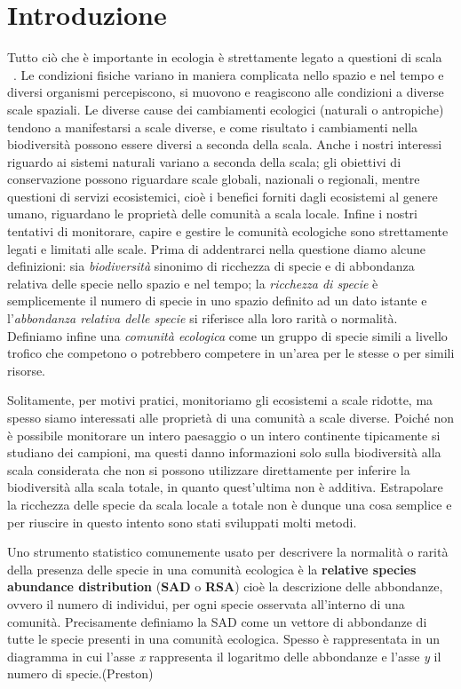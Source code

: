 \chapter*{Introduzione}
Tutto ciò che è importante in ecologia è strettamente legato a questioni di scala ~\cite{doi:10.1111/2041-210X.12319}. Le condizioni fisiche variano in maniera complicata nello spazio e nel tempo e diversi organismi percepiscono, si muovono e reagiscono alle condizioni a diverse scale spaziali. 
Le diverse cause dei cambiamenti ecologici (naturali o antropiche) tendono a manifestarsi a scale diverse, e come risultato i cambiamenti nella biodiversità possono essere diversi a seconda della scala. Anche i nostri interessi riguardo ai sistemi naturali variano a seconda della scala; gli obiettivi di conservazione possono riguardare scale globali, nazionali o regionali, mentre questioni di servizi ecosistemici, cioè i benefici forniti dagli ecosistemi al genere umano, riguardano le proprietà delle comunità a scala locale. Infine i nostri tentativi di monitorare, capire e gestire le comunità ecologiche sono strettamente legati e limitati alle scale.
 Prima di addentrarci nella questione diamo alcune definizioni: sia \emph{biodiversità} sinonimo di ricchezza di specie e di abbondanza relativa delle specie nello spazio e nel tempo; la \emph{ricchezza di specie} è semplicemente il numero di specie in uno spazio definito ad un dato istante e l'\emph{abbondanza relativa delle specie} si riferisce alla loro rarità o normalità. Definiamo infine una \emph{comunità ecologica} come un gruppo di specie simili a livello trofico che competono o potrebbero competere in un'area per le stesse o per simili risorse. 
 
Solitamente, per motivi pratici, monitoriamo gli ecosistemi a scale ridotte, ma spesso siamo interessati alle proprietà di una comunità a scale diverse.
Poiché non è possibile monitorare un intero paesaggio o un intero continente tipicamente si studiano dei campioni, ma questi danno informazioni solo sulla biodiversità alla scala considerata che non si possono utilizzare direttamente per inferire la biodiversità alla scala totale, in quanto quest'ultima non è additiva. Estrapolare la ricchezza delle specie da scala locale a totale non è dunque una cosa semplice e per riuscire in questo intento sono stati sviluppati molti metodi.

Uno strumento statistico comunemente usato per descrivere la normalità o rarità della presenza delle specie in una comunità ecologica è la \textbf{relative species abundance distribution} (\textbf{SAD} o \textbf{RSA}) cioè la descrizione delle abbondanze, ovvero il numero di individui, per ogni specie osservata all'interno di una comunità\cite{doi:McGill2007}. Precisamente definiamo la SAD come un vettore di abbondanze di tutte le specie presenti in una comunità ecologica. Spesso è rappresentata in un diagramma in cui l'asse \emph{x} rappresenta il logaritmo delle abbondanze e l'asse \emph{y} il numero di specie.(Preston)

